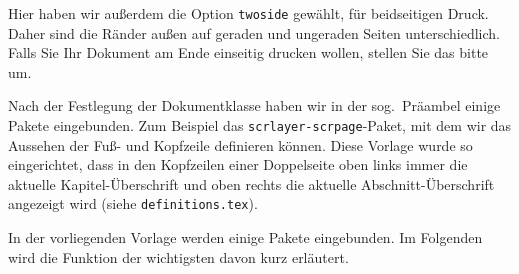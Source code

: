 \par
Hier haben wir außerdem die Option \texttt{twoside} gewählt, für beidseitigen Druck. Daher sind die Ränder außen auf geraden und ungeraden Seiten unterschiedlich. Falls Sie Ihr Dokument am Ende einseitig drucken wollen, stellen Sie das bitte um.
\par
Nach der Festlegung der Dokumentklasse haben wir in der sog.\ Präambel einige Pakete eingebunden. Zum Beispiel das \texttt{scrlayer-scrpage}-Paket, mit dem wir das Aussehen der Fuß- und Kopfzeile definieren können. Diese Vorlage wurde so eingerichtet, dass in den Kopfzeilen einer Doppelseite oben links immer die aktuelle Kapitel-Überschrift und oben rechts die aktuelle Abschnitt-Überschrift angezeigt wird (siehe \texttt{definitions.tex}).
\par
In der vorliegenden Vorlage werden einige Pakete eingebunden. Im Folgenden wird die Funktion der wichtigsten davon kurz erläutert.
%
